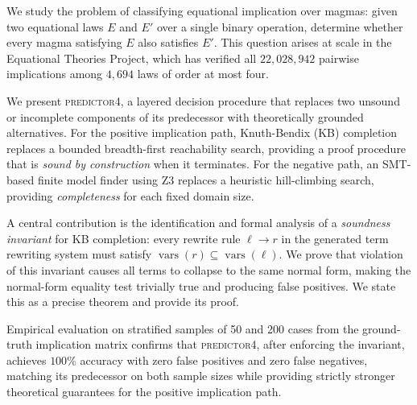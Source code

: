 We study the problem of classifying equational implication over magmas: given
two equational laws $E$ and $E'$ over a single binary operation, determine whether
every magma satisfying $E$ also satisfies $E'$.  This question arises at scale in
the Equational Theories Project, which has verified all $22{,}028{,}942$ pairwise
implications among $4{,}694$ laws of order at most four.

We present \textsc{predictor4}, a layered decision procedure that replaces two
unsound or incomplete components of its predecessor with theoretically grounded
alternatives.  For the positive implication path, Knuth-Bendix (KB) completion
replaces a bounded breadth-first reachability search, providing a proof procedure
that is \emph{sound by construction} when it terminates.  For the negative path,
an SMT-based finite model finder using Z3 replaces a heuristic hill-climbing search,
providing \emph{completeness} for each fixed domain size.

A central contribution is the identification and formal analysis of a \emph{soundness
invariant} for KB completion: every rewrite rule $\ell \to r$ in the generated term
rewriting system must satisfy $\operatorname{vars}(r) \subseteq \operatorname{vars}(\ell)$.
We prove that violation of this invariant causes all terms to collapse to the same
normal form, making the normal-form equality test trivially true and producing false
positives.  We state this as a precise theorem and provide its proof.

Empirical evaluation on stratified samples of 50 and 200 cases from the ground-truth
implication matrix confirms that \textsc{predictor4}, after enforcing the invariant,
achieves $100\%$ accuracy with zero false positives and zero false negatives, matching
its predecessor on both sample sizes while providing strictly stronger theoretical
guarantees for the positive implication path.
